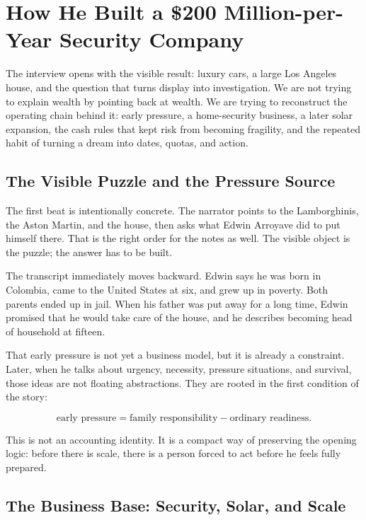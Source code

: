 \chapter{How He Built a \$200 Million-per-Year Security Company}

The interview opens with the visible result: luxury cars, a large Los Angeles house, and the question that turns display into investigation. We are not trying to explain wealth by pointing back at wealth. We are trying to reconstruct the operating chain behind it: early pressure, a home-security business, a later solar expansion, the cash rules that kept risk from becoming fragility, and the repeated habit of turning a dream into dates, quotas, and action.

\section{The Visible Puzzle and the Pressure Source}

The first beat is intentionally concrete. The narrator points to the Lamborghinis, the Aston Martin, and the house, then asks what Edwin Arroyave did to put himself there. That is the right order for the notes as well. The visible object is the puzzle; the answer has to be built.

The transcript immediately moves backward. Edwin says he was born in Colombia, came to the United States at six, and grew up in poverty. Both parents ended up in jail. When his father was put away for a long time, Edwin promised that he would take care of the house, and he describes becoming head of household at fifteen.

That early pressure is not yet a business model, but it is already a constraint. Later, when he talks about urgency, necessity, pressure situations, and survival, those ideas are not floating abstractions. They are rooted in the first condition of the story:

\begin{equation}
\text{early pressure}
=
\text{family responsibility}
-
\text{ordinary readiness}.
\end{equation}

This is not an accounting identity. It is a compact way of preserving the opening logic: before there is scale, there is a person forced to act before he feels fully prepared.

\section{The Business Base: Security, Solar, and Scale}

